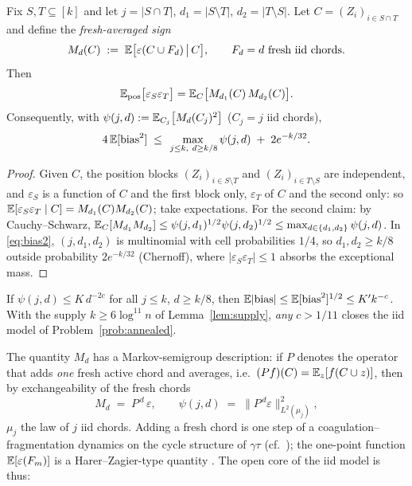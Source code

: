 \begin{theorem}\label{thm:factor}
Fix $S,T\subseteq[k]$ and let $j=|S\cap T|$, $d_1=|S\setminus T|$,
$d_2=|T\setminus S|$.  Let $C=(Z_i)_{i\in S\cap T}$ and define the
\emph{fresh-averaged sign}
\[
M_d(C)\;:=\;\mathbb{E}\bigl[\varepsilon(C\cup F_d)\,\big|\,C\bigr],
\qquad F_d=d\text{ fresh iid chords}.
\]
Then
\[
\mathbb{E}_{\mathrm{pos}}\bigl[\varepsilon_S\varepsilon_T\bigr]
=\mathbb{E}_C\bigl[M_{d_1}(C)\,M_{d_2}(C)\bigr].
\]
Consequently, with
$\psi(j,d):=\mathbb{E}_{C_j}\bigl[M_d(C_j)^2\bigr]$ ($C_j=j$ iid chords),
\[
4\,\mathbb{E}[\mathrm{bias}^2]
\;\le\;\max_{\,j\le k,\ d\ge k/8}\psi(j,d)\;+\;2e^{-k/32}.
\]
\end{theorem}

\begin{proof}
Given $C$, the position blocks $(Z_i)_{i\in S\setminus T}$ and
$(Z_i)_{i\in T\setminus S}$ are independent, and
$\varepsilon_S$ is a function of $C$ and the first block only,
$\varepsilon_T$ of $C$ and the second only: so
$\mathbb{E}[\varepsilon_S\varepsilon_T\mid C]=M_{d_1}(C)M_{d_2}(C)$; take
expectations.  For the second claim: by Cauchy--Schwarz,
$\mathbb{E}_C[M_{d_1}M_{d_2}]\le\psi(j,d_1)^{1/2}\psi(j,d_2)^{1/2}
\le\max_{d\in\{d_1,d_2\}}\psi(j,d)$.  In \eqref{eq:bias2},
$(j,d_1,d_2)$ is multinomial with cell probabilities $1/4$, so
$d_1,d_2\ge k/8$ outside probability $2e^{-k/32}$ (Chernoff), where
$|\varepsilon_S\varepsilon_T|\le1$ absorbs the exceptional mass.
\end{proof}

\begin{corollary}\label{cor:psienough}
If $\psi(j,d)\le K\,d^{-2c}$ for all $j\le k$, $d\ge k/8$, then
$\mathbb{E}|\mathrm{bias}|\le\mathbb{E}[\mathrm{bias}^2]^{1/2}\le K'k^{-c}$.  With
the supply $k\ge6\log^{11}n$ of Lemma~\ref{lem:supply}, \emph{any}
$c>1/11$ closes the iid model of Problem~\ref{prob:annealed}.
\end{corollary}

The quantity $M_d$ has a Markov-semigroup description: if $P$
denotes the operator that adds \emph{one} fresh active chord and
averages, i.e.\ $(Pf)(C)=\mathbb{E}_z[f(C\cup z)]$, then by exchangeability
of the fresh chords
\[
M_d\;=\;P^{\,d}\,\varepsilon,
\qquad
\psi(j,d)\;=\;\bigl\|P^{\,d}\varepsilon\bigr\|_{L^2(\mu_j)}^2,
\]
$\mu_j$ the law of $j$ iid chords.  Adding a fresh chord is one step
of a coagulation--fragmentation dynamics on the cycle structure of
$\gamma\tau$ (cf.\ \cite{Sch05}); the one-point function
$\mathbb{E}[\varepsilon(F_m)]$ is a Harer--Zagier-type quantity
\cite{HZ86}.  The open core of the iid model is thus:

